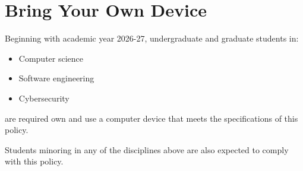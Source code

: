 \section{Bring Your Own Device}

Beginning with academic year 2026-27, undergraduate and graduate students in:

\begin{itemize}
    \item Computer science
    \item Software engineering
    \item Cybersecurity
\end{itemize}

are required own and use a computer device that meets the specifications of this policy.

Students minoring in any of the disciplines above are also expected to comply with this policy.